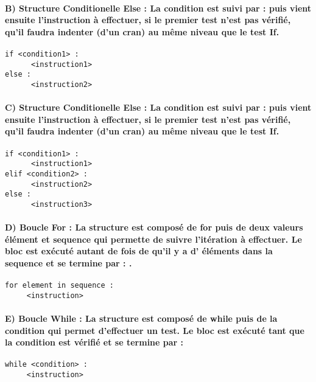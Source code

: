 \documentclass[a4paper, 12pt, twoside]{article}
\begin{document}
\paragraph{B) Structure Conditionelle Else : \newline
La condition est suivi par  :  puis vient ensuite l'instruction à effectuer, si le premier test n'est pas vérifié, qu'il faudra indenter (d'un cran) au même niveau que le test If.}
\begin{verbatim}
if <condition1> :
      <instruction1>
else :
      <instruction2>
\end{verbatim}

\paragraph{C) Structure Conditionelle Else : \newline
La condition est suivi par  :  puis vient ensuite l'instruction à effectuer, si le premier test n'est pas vérifié, qu'il faudra indenter (d'un cran) au même niveau que le test If.}
\begin{verbatim}
if <condition1> :
      <instruction1>
elif <condition2> :
      <instruction2>
else : 
      <instruction3>
\end{verbatim}

\paragraph{D) Boucle For : \newline
La structure est composé de for puis de deux valeurs élément et sequence qui permette de suivre l'itération à effectuer. Le bloc 
est exécuté autant de fois de qu'il y a d' éléments dans la sequence et se termine par  : .}
\begin{verbatim}
for element in sequence :
     <instruction>
\end{verbatim}

\paragraph{E) Boucle While : \newline
La structure est composé de while puis de la condition qui permet d'effectuer un test. Le bloc est exécuté tant que la condition est vérifié et se termine par  : }
\begin{verbatim}
while <condition> :
     <instruction>
\end{verbatim}
\end{document}
